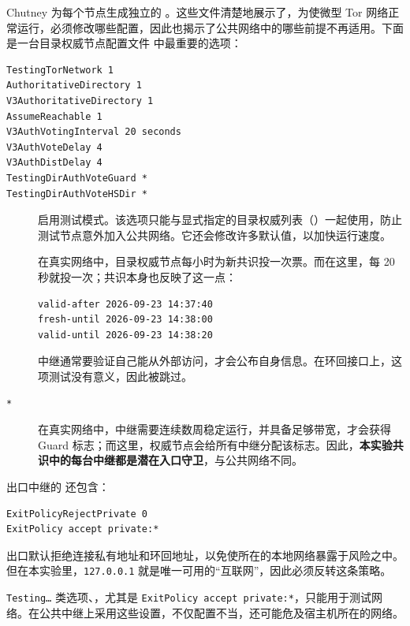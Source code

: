 Chutney 为每个节点生成独立的 。这些文件清楚地展示了，为使微型 Tor 网络正常运行，必须修改哪些配置，因此也揭示了公共网络中的哪些前提不再适用。下面是一台目录权威节点配置文件  中最重要的选项：
\begin{lstlisting}[language=torrc,numbers=none]
TestingTorNetwork 1
AuthoritativeDirectory 1
V3AuthoritativeDirectory 1
AssumeReachable 1
V3AuthVotingInterval 20 seconds
V3AuthVoteDelay 4
V3AuthDistDelay 4
TestingDirAuthVoteGuard *
TestingDirAuthVoteHSDir *
\end{lstlisting}

\begin{description}
  \item[] 启用测试模式。该选项只能与显式指定的目录权威列表（）一起使用，防止测试节点意外加入公共网络。它还会修改许多默认值，以加快运行速度。
  \item[] 在真实网络中，目录权威节点每小时为新共识投一次票。而在这里，每 20 秒就投一次；共识本身也反映了这一点：
\begin{lstlisting}[numbers=none]
valid-after 2026-09-23 14:37:40
fresh-until 2026-09-23 14:38:00
valid-until 2026-09-23 14:38:20
\end{lstlisting}
  \item[] 中继通常要验证自己能从外部访问，才会公布自身信息。在环回接口上，这项测试没有意义，因此被跳过。
  \item[ \texttt{*}] 在真实网络中，中继需要连续数周稳定运行，并具备足够带宽，才会获得 Guard 标志；而这里，权威节点会给所有中继分配该标志。因此，\textbf{本实验共识中的每台中继都是潜在入口守卫}，与公共网络不同。
\end{description}

出口中继的  还包含：
\begin{lstlisting}[language=torrc,numbers=none]
ExitPolicyRejectPrivate 0
ExitPolicy accept private:*
\end{lstlisting}
出口默认拒绝连接私有地址和环回地址，以免使所在的本地网络暴露于风险之中。但在本实验里，\texttt{127.0.0.1} 就是唯一可用的\enquote{互联网}，因此必须反转这条策略。

\begin{attenzione}[不要在其他环境中照搬这些选项]
\texttt{Testing\ldots} 类选项、，尤其是 \texttt{ExitPolicy accept private:*}，只能用于测试网络。在公共中继上采用这些设置，不仅配置不当，还可能危及宿主机所在的网络。
\end{attenzione}

